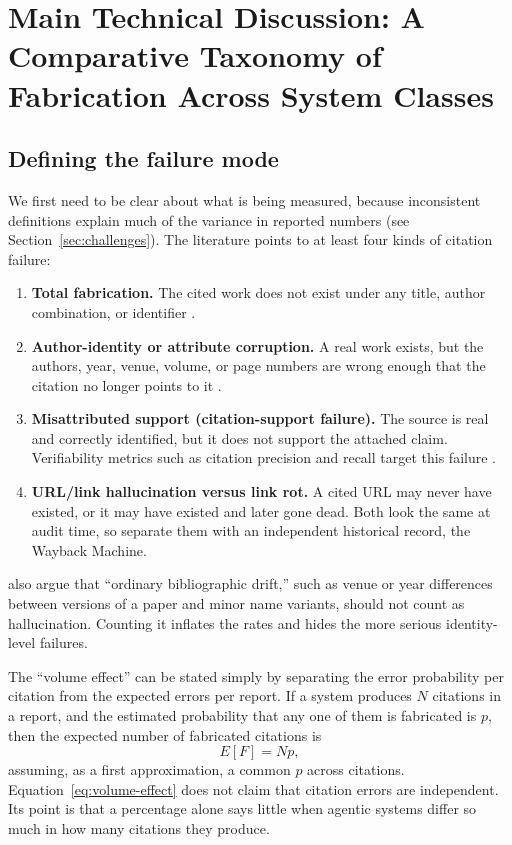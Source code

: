 \documentclass[acmsmall,screen]{acmart}
\begin{document}
\section{Main Technical Discussion: A Comparative Taxonomy of Fabrication Across System Classes}\label{sec:taxonomy}
\subsection{Defining the failure mode}
We first need to be clear about what is being measured, because inconsistent definitions explain much of the variance in reported numbers (see Section~\ref{sec:challenges}). The literature points to at least four kinds of citation failure:

\begin{enumerate}
\item \textbf{Total fabrication.} The cited work does not exist under any title, author combination, or identifier \citep{bhattacharyya2023,ansari2026}.
\item \textbf{Author-identity or attribute corruption.} A real work exists, but the authors, year, venue, volume, or page numbers are wrong enough that the citation no longer points to it \citep{walters2023,russinovich2026b}.
\item \textbf{Misattributed support (citation-support failure).} The source is real and correctly identified, but it does not support the attached claim. Verifiability metrics such as citation precision and recall target this failure \citep{liu2023,gao2023}.
\item \textbf{URL/link hallucination versus link rot.} A cited URL may never have existed, or it may have existed and later gone dead. Both look the same at audit time, so \citet{rao2026} separate them with an independent historical record, the Wayback Machine.
\end{enumerate}

\citet{russinovich2026b} also argue that ``ordinary bibliographic drift,'' such as venue or year differences between versions of a paper and minor name variants, should not count as hallucination. Counting it inflates the rates and hides the more serious identity-level failures.

The ``volume effect'' can be stated simply by separating the error probability per citation from the expected errors per report. If a system produces $N$ citations in a report, and the estimated probability that any one of them is fabricated is $p$, then the expected number of fabricated citations is
\begin{equation}
E[F] = Np,
\label{eq:volume-effect}
\end{equation}
assuming, as a first approximation, a common $p$ across citations. Equation~\eqref{eq:volume-effect} does not claim that citation errors are independent. Its point is that a percentage alone says little when agentic systems differ so much in how many citations they produce.
\end{document}
